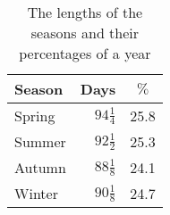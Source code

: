 \begin{table}[b]
\begin{center}
\begin{sffamily}
\renewcommand{\arraystretch}{1.3}
\begin{tabular}{|l|r|r|}
\hline
Season & \multicolumn{1}{|c|}{Days}&\multicolumn{1}{|c|}{$\%$}\\\hline\hline
Spring & $94\frac{1}{4}$ & 25.8\\\hline
Summer & $92\frac{1}{2}$ & 25.3\\\hline
Autumn & $88\frac{1}{8}$ & 24.1\\\hline
Winter & $90\frac{1}{8}$ & 24.7\\\hline
\end{tabular}
\end{sffamily}
\caption{The lengths of the seasons and their percentages of a year}\label{t.seasons}
\end{center}
\end{table}

